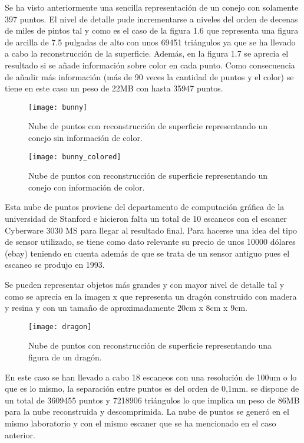 Se ha visto anteriormente una sencilla representación de un conejo con solamente 397 puntos. El nivel de detalle pude incrementarse a niveles del orden de decenas de miles de pintos tal y como es el caso de la figura 1.6 que representa una figura de arcilla de 7.5 pulgadas de alto con unos 69451 triángulos ya que se ha llevado a cabo la reconstrucción de la superficie. Además, en la figura 1.7 se aprecia el resultado si se añade información sobre color en cada punto.
Como consecuencia de añadir más información (más de 90 veces la cantidad de puntos y el color) se tiene en este caso un peso de 22MB con hasta 35947 puntos.
\begin{figure}[!htb]
  \texttt{[image: bunny]}
  \caption{Nube de puntos con reconstrucción de superficie representando un conejo sin información de color.}\label{fig:bunny}
\endminipage\hfill
{}
  \texttt{[image: bunny\_colored]}
  \caption{Nube de puntos con reconstrucción de superficie representando un conejo con información de color.}\label{fig:bunny_colored}
\endminipage\hfill
\end{figure}
Esta nube de puntos proviene del departamento de computación gráfica de la universidad de Stanford e hicieron falta un total de 10 escaneos con el escaner Cyberware 3030 MS para llegar al resultado final. Para hacerse una idea del tipo de sensor utilizado, se tiene como dato relevante su precio de unos 10000 dólares (ebay) teniendo en cuenta además de que se trata de un sensor antiguo pues el escaneo se produjo en 1993.

Se pueden representar objetos más grandes y con mayor nivel de detalle tal y como se aprecia en la imagen x que representa un dragón construido con madera y resina y con un tamaño de aproximadamente 20cm x 8cm x 9cm.

\begin{figure}
\centering
\texttt{[image: dragon]}
\caption{Nube de puntos con reconstrucción de superficie representando una figura de un dragón.}\label{fig:dragon}
\end{figure}

En este caso se han llevado a cabo 18 escaneos con una resolución de 100um o lo que es lo mismo, la separación entre puntos es del orden de 0,1mm. se dispone de un total de 3609455 puntos y 7218906 triángulos lo que implica un peso de 86MB para la nube reconstruida y descomprimida.
La nube de puntos se generó en el mismo laboratorio y con el mismo escaner que se ha mencionado en el caso anterior.

